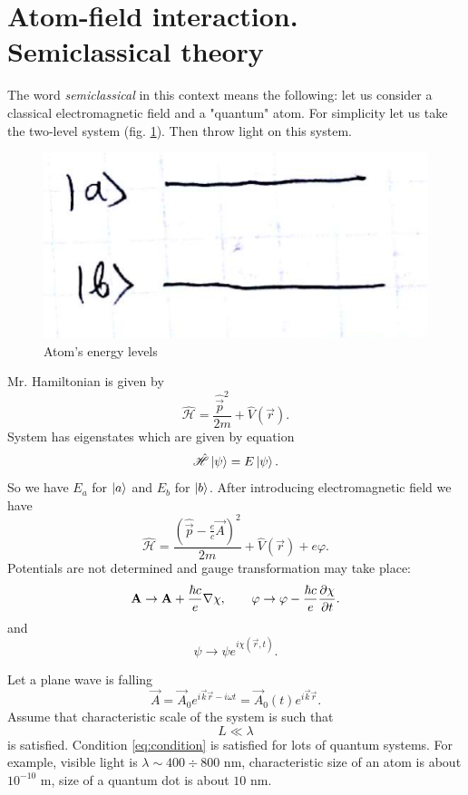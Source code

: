 \section{Atom-field interaction. Semiclassical theory}
\label{sec:atom-field_interaction}

The word \textit{semiclassical} in this context means the following: let us consider a classical electromagnetic field and a "quantum" atom. For simplicity let us take the two-level system (fig. \ref{fig:2lvl}). Then throw light on this system.
\begin{figure}[h!]
	\centering
	\includegraphics[width=0.35\linewidth]{fig/L4/2lvl}
	\caption{Atom's energy levels }
	\label{fig:2lvl}
\end{figure}

Mr. Hamiltonian is given by
\begin{equation}
	\hat{\mathscr{H}} = \frac{\hat{\vec{p}}^2}{2 m} + \hat{V} (\vec{r}).
\end{equation}
System has eigenstates which are given by equation
\begin{equation}
	\hat{\mathscr{H}} \left\lvert {\psi} \right\rangle = E \left\lvert {\psi} \right\rangle.
\end{equation}
So we have $E_a$ for $\left\lvert {a} \right\rangle$ and $E_b$ for $\left\lvert {b} \right\rangle$. After introducing electromagnetic field we have
\begin{equation}
	\hat{\mathscr{H}} = \frac{(\hat{\vec{p}} - \frac{e}{c} \vec{A})^2}{2m} + \hat{V}(\vec{r}) + e \varphi.
\end{equation}
Potentials are not determined and gauge transformation may take place:
\begin{equation}
	\mathbf{A} \to \mathbf{A} + \frac{\hbar c}{e} \nabla \chi, \qquad \varphi \to \varphi - \frac{\hbar c}{e} \dfrac{\partial {\chi}}{\partial {t}}.
\end{equation}
and
\begin{equation}
	\psi \to \psi e^{i \chi(\vec{r},t)}.
\end{equation}

Let a plane wave is falling
\begin{equation}
	\vec{A} = \vec{A}_0 e^{i \vec{k}\vec{r} - i \omega t} = \vec{A}_0(t) e^{i \vec{k}\vec{r}}.
\end{equation}
Assume that characteristic scale of the system is such that
\begin{equation}
	L \ll \lambda
	\label{eq:condition}
\end{equation}
is satisfied. Condition \eqref{eq:condition} is satisfied for lots of quantum systems.
For example, visible light is $\lambda \sim 400 \div 800 \text{ nm}$,
characteristic size of an atom is about $10^{-10} \text{ m}$, size of a quantum dot is about $10 \text{ nm}$.

